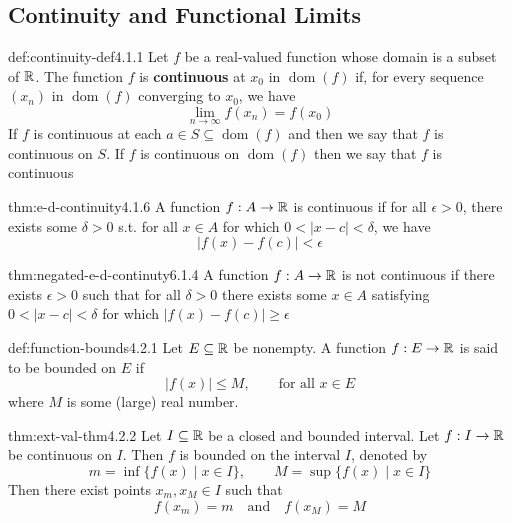 \documentclass[landscape, 8pt]{extarticle}
\DeclareMathOperator{\dom}{dom}
\begin{document}
\begin{multicols}{3}
\newpage



\subsection*{Continuity and Functional Limits}

\begin{dfn}[Continuity]{def:continuity-def}{4.1.1}
    Let $f$ be a real-valued function whose domain is a subset of $\mathbb{R}$. The function $f$ is \textbf{continuous} at $x_{0}$ in $\dom{(f)}$ if, for every sequence $(x_{n})$ in $\dom{(f)}$ converging to $x_{0}$, we have 
    \[\displaystyle\lim_{ n \to \infty }f(x_{n})=f(x_{0})\]
    If $f$ is continuous at each $a\in S \subseteq \dom{(f)}$ and then we say that $f$ is continuous on $S$. If $f$ is continuous on $\dom{(f)}$ then we say that $f$ is continuous
\end{dfn}
\vspace{-5pt}

\begin{thm}{thm:e-d-continuity}{4.1.6}
    A function $f:A\to\mathbb{R}$ is continuous if for all $\epsilon>0$, there exists some $\delta>0$ s.t. for all $x \in A$ for which $0<\lvert x-c \rvert <\delta$, we have 
    \[\lvert f(x)-f(c) \rvert < \epsilon\]
\end{thm}
\vspace{-5pt}

\begin{thm}{thm:negated-e-d-continuty}{6.1.4}
    A function $f:A\to\mathbb{R}$ is not continuous if there exists $\epsilon>0$ such that for all $\delta>0$ there exists some $x \in A$ satisfying $0<\lvert x-c \rvert<\delta$ for which $\lvert  f(x)-f(c) \rvert\ge \epsilon$
\end{thm}
\vspace{-5pt}

\begin{dfn}{def:function-bounds}{4.2.1}
Let $E\subseteq\mathbb{R}$ be nonempty. A function $f:E\to \mathbb{R}$ is said to be bounded on $E$ if
\[\lvert f(x)\rvert \le M,\qquad \text{for all } x\in E\]
where $M$ is some (large) real number.
\end{dfn}
\vspace{-5pt}

\begin{thm}{thm:ext-val-thm}{4.2.2}
Let $I\subseteq \mathbb{R}$ be a closed and bounded interval. Let $f:I\to \mathbb{R}$ be continuous on $I$. Then $f$ is bounded on the interval $I$, denoted by
\[m = \inf\{f(x)\mid x\in I\},\qquad M = \sup\{f(x)\mid x\in I\}\]
Then there exist points $x_{m}, x_{M}\in I$ such that
\[f(x_{m}) = m \quad \text{and} \quad f(x_{M}) = M\]
\end{thm}
\vspace{-5pt}


\end{multicols}
\end{document}
